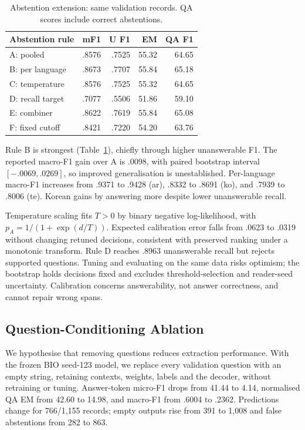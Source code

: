 \documentclass[11pt]{article}
\begin{document}
\begin{table}[t]
\centering\small\setlength{\tabcolsep}{4pt}
\begin{tabular}{lrrrr}
\toprule
Abstention rule & mF1 & U F1 & EM & QA F1\\
\midrule
A: pooled & .8576 & .7525 & 55.32 & 64.65\\
B: per language & .8673 & .7707 & 55.84 & 65.18\\
C: temperature & .8576 & .7525 & 55.32 & 64.65\\
D: recall target & .7077 & .5506 & 51.86 & 59.10\\
E: combiner & .8622 & .7619 & 55.84 & 65.08\\
F: fixed cutoff & .8421 & .7220 & 54.20 & 63.76\\
\bottomrule
\end{tabular}
\caption{Abstention extension: same validation records. QA scores include correct abstentions.}
\label{tab:calibration}
\end{table}
Rule B is strongest (Table~\ref{tab:calibration}), chiefly through higher unanswerable F1. The reported macro-F1 gain over A is .0098, with paired bootstrap interval $[-.0069,.0269]$, so improved generalisation is unestablished. Per-language macro-F1 increases from .9371 to .9428 (ar), .8332 to .8691 (ko), and .7939 to .8006 (te). Korean gains by answering more despite lower unanswerable recall.

Temperature scaling \citep{temperature} fits $T>0$ by binary negative log-likelihood, with $p_A=1/(1+\exp(d/T))$. Expected calibration error falls from .0623 to .0319 without changing retuned decisions, consistent with preserved ranking under a monotonic transform. Rule D reaches .8963 unanswerable recall but rejects supported questions. Tuning and evaluating on the same data risks optimism; the bootstrap holds decisions fixed and excludes threshold-selection and reader-seed uncertainty. Calibration concerns answerability, not answer correctness, and cannot repair wrong spans.

\subsection{Question-Conditioning Ablation}
We hypothesise that removing questions reduces extraction performance. With the frozen BIO seed-123 model, we replace every validation question with an empty string, retaining contexts, weights, labels and the decoder, without retraining or tuning. Answer-token micro-F1 drops from 41.44 to 4.14, normalised QA EM from 42.60 to 14.98, and macro-F1 from .6004 to .2362. Predictions change for 766/1,155 records; empty outputs rise from 391 to 1,008 and false abstentions from 282 to 863.
\end{document}
